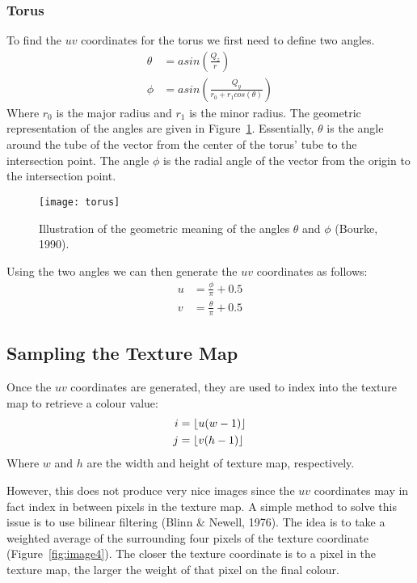 \subsubsection*{Torus}
To find the $uv$ coordinates for the torus we first need to define two angles.
\begin{equation}
\begin{split}
  \theta &= asin(\frac{Q_{z}}{r}) \\
  \phi &= asin(\frac{Q_{y}}{r_{0} + r_{1}cos(\theta)})
\end{split}
\end{equation}
Where $r_{0}$ is the major radius and $r_{1}$ is the minor radius. The geometric
representation of the angles are given in Figure~\ref{fig:image3}. Essentially,
$\theta$ is the angle around the tube of the vector from the center of the 
torus' tube to the intersection point. The angle $\phi$ is the radial angle of
the vector from the origin to the intersection point.

\begin{figure}[ht]
  \texttt{[image: torus]}
  \caption{Illustration of the geometric meaning of the angles $\theta$ and 
  $\phi$ (Bourke, 1990).}
  \label{fig:image3}
\end{figure}

Using the two angles we can then generate the $uv$ coordinates as follows:
\begin{equation}
\begin{split}
  u &= \frac{\phi}{\pi} + 0.5 \\
  v &= \frac{\theta}{\pi} + 0.5
\end{split}
\end{equation}

\subsection{Sampling the Texture Map}
Once the $uv$ coordinates are generated, they are used to index into the texture
map to retrieve a colour value:
\begin{equation}
\begin{split}
  i &= \floor*{u(w - 1)} \\
  j &= \floor*{v(h - 1)}
\end{split}
\end{equation}
Where $w$ and $h$ are the width and height of texture map, respectively.

However, this does not produce very nice images since the $uv$ coordinates may
in fact index in between pixels in the texture map. A simple method to solve
this issue is to use bilinear filtering (Blinn \& Newell, 1976). The idea is to
take a weighted average of the surrounding four pixels of the texture coordinate
(Figure~\ref{fig:image4}). The closer the texture coordinate is to a pixel in
the texture map, the larger the weight of that pixel on the final colour.

